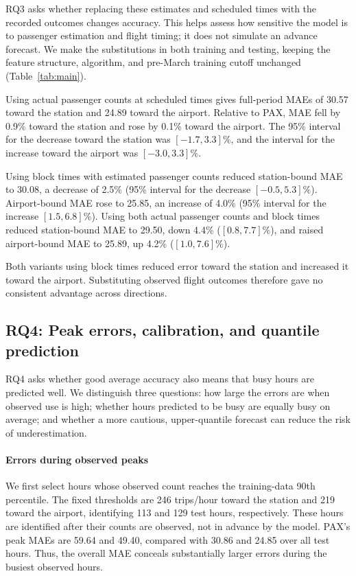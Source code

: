 \documentclass[preprint,12pt,times]{elsarticle}
\begin{document}
RQ3 asks whether replacing these estimates and scheduled times with the recorded outcomes changes accuracy. This helps assess how sensitive the model is to passenger estimation and flight timing; it does not simulate an advance forecast. We make the substitutions in both training and testing, keeping the feature structure, algorithm, and pre-March training cutoff unchanged (Table~\ref{tab:main}).

Using actual passenger counts at scheduled times gives full-period MAEs of 30.57 toward the station and 24.89 toward the airport. Relative to PAX, MAE fell by 0.9\% toward the station and rose by 0.1\% toward the airport. The 95\% interval for the decrease toward the station was $[-1.7,3.3]\%$, and the interval for the increase toward the airport was $[-3.0,3.3]\%$.

Using block times with estimated passenger counts reduced station-bound MAE to 30.08, a decrease of 2.5\% (95\% interval for the decrease $[-0.5,5.3]\%$). Airport-bound MAE rose to 25.85, an increase of 4.0\% (95\% interval for the increase $[1.5,6.8]\%$). Using both actual passenger counts and block times reduced station-bound MAE to 29.50, down 4.4\% ($[0.8,7.7]\%$), and raised airport-bound MAE to 25.89, up 4.2\% ($[1.0,7.6]\%$).

Both variants using block times reduced error toward the station and increased it toward the airport. Substituting observed flight outcomes therefore gave no consistent advantage across directions.

\subsection{RQ4: Peak errors, calibration, and quantile prediction}
\label{sec:peaks}
RQ4 asks whether good average accuracy also means that busy hours are predicted well. We distinguish three questions: how large the errors are when observed use is high; whether hours predicted to be busy are equally busy on average; and whether a more cautious, upper-quantile forecast can reduce the risk of underestimation.

\paragraph{Errors during observed peaks}
We first select hours whose observed count reaches the training-data 90th percentile. The fixed thresholds are 246 trips/hour toward the station and 219 toward the airport, identifying 113 and 129 test hours, respectively. These hours are identified after their counts are observed, not in advance by the model. PAX's peak MAEs are 59.64 and 49.40, compared with 30.86 and 24.85 over all test hours. Thus, the overall MAE conceals substantially larger errors during the busiest observed hours.
\end{document}
